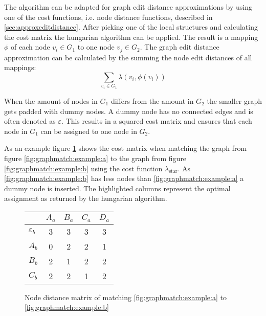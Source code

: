 \documentclass[
    12pt,                               %
    DIV=14,                     %
    parskip=half+,              %
    bigheadings,                %
    cleardoubleempty,   %
    halfparskip,                %
    ]{scrreprt} %
\begin{document}
The algorithm can be adapted for graph edit distance approximations by using one of the cost functions, i.e. node distance functions, described in \ref{sec:approxeditdistance}.
After picking one of the local structures and calculating the cost matrix the hungarian algorithm can be applied. The result is a mapping $\phi$ of each node $v_i \in G_1$ to one node $v_j \in G_2$. The graph edit distance approximation can be calculated by the summing the node edit distances of all mappings:
\begin{equation}
\sum_{v_i \in G_1} \lambda(v_i, \phi(v_i))
\end{equation}

When the amount of nodes in $G_1$ differs from the amount in $G_2$ the smaller graph gets padded with dummy nodes. A dummy node has no connected edges and is often denoted as $\varepsilon$. This results in a squared cost matrix and ensures that each node in $G_1$ can be assigned to one node in $G_2$.

As an example figure \ref{fig:graphmatch:distance} shows the cost matrix when matching the graph from figure \ref{fig:graphmatch:example:a} to the graph from figure \ref{fig:graphmatch:example:b} using the cost function $\lambda_{\text{star}}$. As \ref{fig:graphmatch:example:b} has less nodes than \ref{fig:graphmatch:example:a} a dummy node is inserted. The highlighted columns represent the optimal assignment as returned by the hungarian algorithm.

\begin{figure}[H]
	\centering
	\begin{tabular}{| l | c | c | c | c |}
		\hline
						& $A_a$ & $B_a$ & $C_a$ & $D_a$ \\
		\hline
		$\varepsilon_b$	& 3 & 3 & 3 & \cellcolor{orange}3 \\
		\hline
		$A_b$			& \cellcolor{orange}0 & 2 & 2 & 1 \\
		\hline
		$B_b$			& 2 & \cellcolor{orange}1 & 2 & 2 \\
		\hline
		$C_b$			& 2 & 2 & \cellcolor{orange}1 & 2 \\
		\hline
	\end{tabular}
	\caption{Node distance matrix of matching \ref{fig:graphmatch:example:a} to \ref{fig:graphmatch:example:b}}
	\label{fig:graphmatch:distance}
\end{figure}

\end{document}
